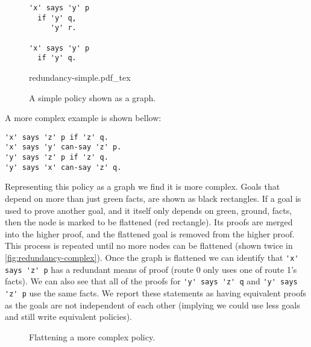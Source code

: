 \documentclass[a4paper]{scrartcl}
\begin{document}
\begin{figure}
  \centering
  \begin{minipage}{0.4\linewidth}
  \begin{lstlisting}
'x' says 'y' p
  if 'y' q,
     'y' r.

'x' says 'y' p
  if 'y' q.
  \end{lstlisting}
  \end{minipage}
  \begin{minipage}{0.59\linewidth}
    \scriptsize{}
    \def\svgwidth{\columnwidth}
    {redundancy-simple.pdf_tex}
  \end{minipage}
  \caption{A simple policy shown as a graph.}
  \label{fig:redundancy-graph-simple}
\end{figure}

A more complex example is shown bellow:
\begin{lstlisting}
'x' says 'z' p if 'z' q.
'x' says 'y' can-say 'z' p.
'y' says 'z' p if 'z' q.
'y' says 'x' can-say 'z' q.
\end{lstlisting}
Representing this policy as a graph we find it is more complex. Goals that
depend on more than just green facts, are shown as black rectangles.  If a goal
is used to prove another goal, and it itself only depends on green, ground,
facts, then the node is marked to be flattened (red rectangle).  Its proofs are
merged into the higher proof, and the flattened goal is removed from the higher
proof.  This process is repeated until no more nodes can be flattened (shown
twice in \autoref{fig:redundancy-complex}).  Once the graph is flattened we can
identify that \lstinline!'x' says 'z' p! has a redundant means of proof (route
0 only uses one of route 1's facts).  We can also see that all of the proofs for 
\lstinline!'y' says 'z' q! and \lstinline!'y' says 'z' p! use the same facts.
We report these statements as having equivalent proofs as the goals are not
independent of each other (implying we could use less goals and still write
equivalent policies).
\begin{figure}
  \centering\tiny
  \caption{Flattening a more complex policy.}
  \label{fig:redundancy-complex}
\end{figure}
\end{document}
